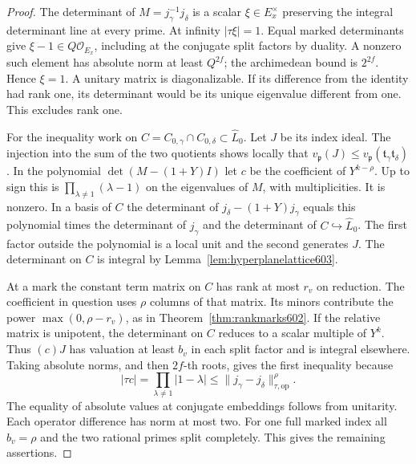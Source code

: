 \documentclass[a4paper,11pt]{article}
\theoremstyle{definition}
\theoremstyle{remark}
\numberwithin{equation}{section}
\begin{document}
\begin{proof}
The determinant of \(M=j_\gamma^{-1}j_\delta\) is a scalar
\(\xi\in E_x^\times\) preserving the integral determinant
line at every prime. At infinity \(|\tau\xi|=1\). Equal
marked determinants give \(\xi-1\in Q\mathcal O_{E_x}\),
including at the conjugate split factors by duality. A
nonzero such element has absolute norm at least \(Q^{2f}\);
the archimedean bound is \(2^{2f}\). Hence \(\xi=1\).
A unitary matrix is diagonalizable. If its difference from
the identity had rank one, its determinant would be its
unique eigenvalue different from one. This excludes rank one.

For the inequality work on
\(C=C_{0,\gamma}\cap C_{0,\delta}\subset\widehat L_0\).
Let \(J\) be its index ideal. The injection into the sum of
the two quotients shows locally that
\(v_{\mathfrak p}(J)\le
 v_{\mathfrak p}(\mathfrak t_\gamma\mathfrak t_\delta)\).
In the polynomial \(\det(M-(1+Y)I)\) let \(c\) be the
coefficient of \(Y^{k-\rho}\). Up to sign this is
\(\prod_{\lambda\ne1}(\lambda-1)\) on the eigenvalues of
\(M\), with multiplicities. It is nonzero. In a basis of
\(C\) the determinant of \(j_\delta-(1+Y)j_\gamma\) equals
this polynomial times the determinant of \(j_\gamma\) and the
determinant of \(C\hookrightarrow\widehat L_0\). The first
factor outside the polynomial is a local unit and the second
generates \(J\). The determinant on \(C\) is integral by
Lemma~\ref{lem:hyperplanelattice603}.

At a mark the constant term matrix on \(C\) has rank at most
\(r_v\) on reduction. The coefficient in question uses \(\rho\)
columns of that matrix. Its minors contribute the power
\(\max(0,\rho-r_v)\), as in Theorem~\ref{thm:rankmarks602}.
If the relative matrix is unipotent, the determinant on \(C\)
reduces to a scalar multiple of \(Y^k\). Thus
\((c)J\) has valuation at least \(b_v\) in each split factor
and is integral elsewhere. Taking absolute norms, and then
\(2f\)-th roots, gives the first inequality because
\[
     |\tau c|=\prod_{\lambda\ne1}|1-\lambda|
              \le\|j_\gamma-j_\delta\|_{\tau,\mathrm{op}}^\rho .
\]
The equality of absolute values at conjugate embeddings
follows from unitarity. Each operator difference has norm at
most two. For one full marked index all \(b_v=\rho\) and the
two rational primes split completely. This gives the remaining
assertions.
\end{proof}
\end{document}
